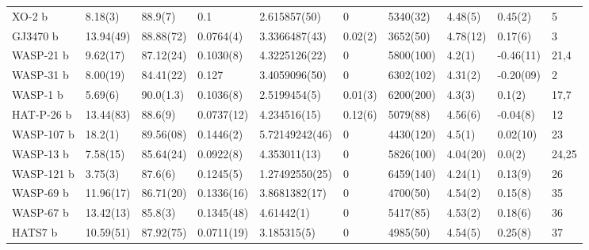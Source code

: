 \begin{subappendices}
{\begin{landscape}
\begin{longtable}{llllllllll}
  XO-2 b       &   8.18(3) &    88.9(7) &       0.1 &               2.615857(50) &      0 &         5340(32) &      4.48(5) &   0.45(2) &                                         5  \\
  GJ3470 b    &  13.94(49) &   88.88(72) &     0.0764(4) &         3.3366487(43) &     0.02(2) &   3652(50) &      4.78(12) &   0.17(6) &                                 3        \\
  WASP-21 b    &   9.62(17) &   87.12(24) &     0.1030(8) &         4.3225126(22) &     0 &         5800(100) &     4.2(1) &  -0.46(11) &                               21,4        \\
  WASP-31 b    &    8.00(19) &  84.41(22) &     0.127 &             3.4059096(50) &     0 &         6302(102) &     4.31(2) &   -0.20(09) &                               2       \\
  WASP-1 b     &   5.69(6) &    90.0(1.3) &     0.1036(8) &         2.5199454(5) &      0.01(3) &   6200(200) &     4.3(3) &     0.1(2) &                            17,7       \\
  HAT-P-26 b    &  13.44(83) &   88.6(9) &       0.0737(12) &        4.234516(15) &      0.12(6) &   5079(88) &      4.56(6) &  -0.04(8) &                               12     \\
  WASP-107 b   &    18.2(1) &   89.56(08) &     0.1446(2) &         5.72149242(46) &    0 &         4430(120) &     4.5(1) &    0.02(10) &                                 23 \\
  WASP-13 b    &   7.58(15) &   85.64(24) &     0.0922(8) &         4.353011(13) &      0 &         5826(100) &     4.04(20) &     0.0(2) &                                 24,25    \\
  WASP-121 b   &   3.75(3) &    87.6(6) &       0.1245(5) &         1.27492550(25) &    0 &         6459(140) &     4.24(1) &   0.13(9) &                                 26  \\
  WASP-69 b    &  11.96(17) &   86.71(20) &     0.1336(16) &        3.8681382(17) &     0 &         4700(50) &      4.54(2) &   0.15(8) &                                35    \\
  WASP-67 b    &  13.42(13) &   85.8(3) &       0.1345(48) &        4.61442(1) &        0 &         5417(85) &      4.53(2) &   0.18(6) &                                36       \\
  HATS7 b     &  10.59(51) &   87.92(75) &     0.0711(19) &        3.185315(5) &       0 &         4985(50) &      4.54(5) &   0.25(8) &                               37  \\

\end{longtable}
\end{landscape}}
\end{subappendices}
